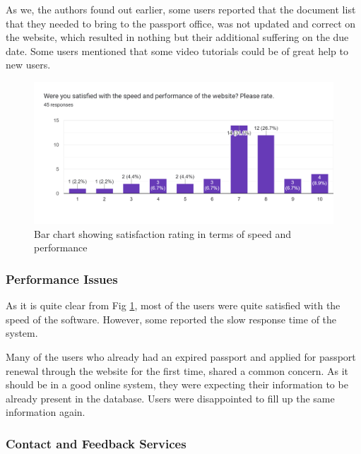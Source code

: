 As we, the authors found out earlier, some users reported that the document list that they needed to bring to the passport office, was not updated and correct on the website, which resulted in nothing but their additional suffering on the due date. Some users mentioned that some video tutorials could be of great help to new users.
\newline

\begin{figure}[ht]
\centering
\centerline{\includegraphics[width=\linewidth]{Figures/speed.png}}
\vspace{-10pt}\caption{Bar chart showing satisfaction rating in terms of speed and performance}
\label{fig:speed}
\end{figure}

\subsubsection{Performance Issues}

As it is quite clear from Fig \ref{fig:speed}, most of the users were quite satisfied with the speed of the software. However, some reported the slow response time of the system. 

Many of the users who already had an expired passport and applied for passport renewal through the website for the first time, shared a common concern. As it should be in a good online system, they were expecting their information to be already present in the database. Users were disappointed to fill up the same information again.
\newline

\subsubsection{Contact and Feedback Services}

